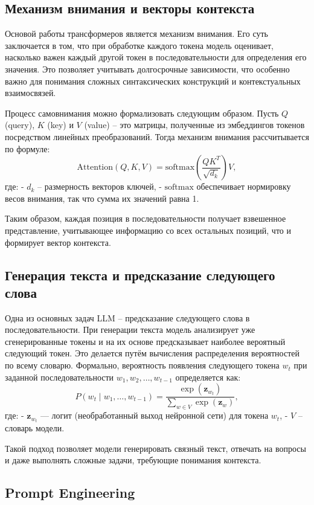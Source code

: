 \subsection{Механизм внимания и векторы контекста}

Основой работы трансформеров является механизм внимания. 
Его суть заключается в том, что при обработке каждого токена модель оценивает, насколько важен каждый другой токен в последовательности для определения его значения. 
Это позволяет учитывать долгосрочные зависимости, что особенно важно для понимания сложных синтаксических конструкций и контекстуальных взаимосвязей.

Процесс самовнимания можно формализовать следующим образом. 
Пусть \(Q\) (query), \(K\) (key) и \(V\) (value) – это матрицы, полученные из эмбеддингов токенов посредством линейных преобразований. 
Тогда механизм внимания рассчитывается по формуле:
\[
\text{Attention}(Q, K, V) = \text{softmax}\left(\frac{QK^T}{\sqrt{d_k}}\right)V,
\]
где:
- \(d_k\) – размерность векторов ключей,
- \(\text{softmax}\) обеспечивает нормировку весов внимания, так что сумма их значений равна 1.

Таким образом, каждая позиция в последовательности получает взвешенное представление, учитывающее информацию со всех остальных позиций, что и формирует вектор контекста.

\subsection{Генерация текста и предсказание следующего слова}

Одна из основных задач LLM – предсказание следующего слова в последовательности. При генерации текста модель анализирует уже сгенерированные токены и на их основе предсказывает наиболее вероятный следующий токен. Это делается путём вычисления распределения вероятностей по всему словарю. Формально, вероятность появления следующего токена \(w_t\) при заданной последовательности \(w_1, w_2, \dots, w_{t-1}\) определяется как:
\[
P(w_t \mid w_1, \dots, w_{t-1}) = \frac{\exp\left(\mathbf{z}_{w_t}\right)}{\sum_{w \in V} \exp\left(\mathbf{z}_w\right)},
\]
где:
- \(\mathbf{z}_{w_t}\) — логит (необработанный выход нейронной сети) для токена \(w_t\),
- \(V\) – словарь модели.

Такой подход позволяет модели генерировать связный текст, отвечать на вопросы и даже выполнять сложные задачи, требующие понимания контекста.

\subsection{Prompt Engineering}

